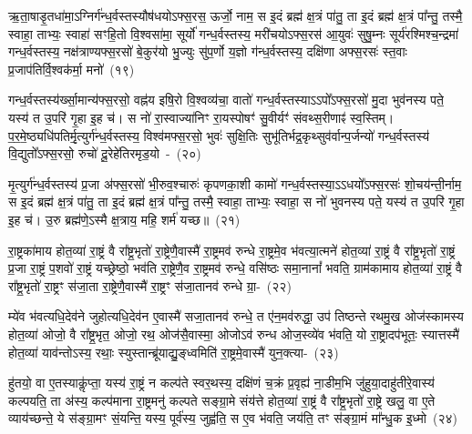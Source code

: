 {\anuvakamend[{प्रा॒जा॒प॒त्याः सो᳚\-ऽष्टाद॑श च}]}

ऋ॒ता॒षाडृ॒तधा॑मा॒\-ऽग्निर्ग॑न्ध॒र्वस्तस्यौष॑धयो\-ऽफ्स॒रस॒ ऊर्जो॒ नाम॒ स इ॒दं ब्रह्म॑ क्ष॒त्रं पा॑तु॒ ता इ॒दं ब्रह्म॑ क्ष॒त्रं पा᳚न्तु॒ तस्मै॒ स्वाहा॒ ताभ्यः॒ स्वाहा॑ सꣳहि॒तो वि॒श्वसा॑मा॒ सूर्यो॑ गन्ध॒र्वस्तस्य॒ मरी॑चयो\-ऽफ्स॒रस॑ आ॒युवः॑ सुषु॒म्नः सूर्य॑रश्मिश्च॒न्द्रमा॑ गन्ध॒र्वस्तस्य॒ नक्ष॑त्राण्यफ्स॒रसो॑ बे॒कुर॑यो भु॒ज्युः सु॑प॒र्णो य॒ज्ञो ग॑न्ध॒र्वस्तस्य॒ दक्षि॑णा अफ्स॒रसः॑ स्त॒वाः प्र॒जा\-प॑तिर्वि॒श्वक॑र्मा॒ मनो॑~(१९)\ip

गन्ध॒र्वस्तस्य॑र्ख्सा॒मान्य॑फ्स॒रसो॒ वह्न॑य इषि॒रो वि॒श्वव्य॑चा॒ वातो॑ गन्ध॒र्वस्तस्या\-ऽऽ\-पो᳚\-ऽफ्स॒रसो॑ मु॒दा भुव॑नस्य पते॒ यस्य॑ त उ॒परि॑ गृ॒हा इ॒ह च॑। स नो॑ रा॒स्वाज्या॑निꣳ रा॒यस्पोषꣳ॑ सु॒वीर्यꣳ॑ संवथ्स॒रीणाꣴ॑ स्व॒स्तिम्। प॒र॒मे॒ष्ठ्यधि॑\-पति\-र्मृ॒त्युर्ग॑न्ध॒र्वस्तस्य॒ विश्व॑मफ्स॒रसो॒ भुवः॑ सुक्षि॒तिः सुभू॑तिर्भद्र॒कृथ्सुव॑र्वान्प॒र्जन्यो॑ गन्ध॒र्वस्तस्य॑ वि॒द्युतो᳚\-ऽफ्स॒रसो॒ रुचो॑ दू॒रेहे॑तिरमृड॒यो~-~(२०)\ip

मृ॒त्युर्ग॑न्ध॒र्वस्तस्य॑ प्र॒जा अ॑फ्स॒रसो॑ भी॒रुव॒श्चारुः॑ कृपणका॒शी कामो॑ गन्ध॒र्वस्तस्या॒\-ऽऽ\-\-धयो᳚\-ऽफ्स॒रसः॑ शो॒चय॑न्ती॒र्नाम॒ स इ॒दं ब्रह्म॑ क्ष॒त्रं पा॑तु॒ ता इ॒दं ब्रह्म॑ क्ष॒त्रं पा᳚न्तु॒ तस्मै॒ स्वाहा॒ ताभ्यः॒ स्वाहा॒ स नो॑ भुवनस्य पते॒ यस्य॑ त उ॒परि॑ गृ॒हा इ॒ह च॑। उ॒रु ब्रह्म॑णे॒\-ऽस्मै क्ष॒त्राय॒ महि॒ शर्म॑ यच्छ॥~(२१)\ip

{\anuvakamend[{मनो॑\-ऽमृड॒यः षट्च॑त्वारिꣳशच्च}]}

रा॒ष्ट्रका॑माय होत॒व्या॑ रा॒ष्ट्रं वै रा᳚ष्ट्र॒भृतो॑ रा॒ष्ट्रेणै॒वास्मै॑ रा॒ष्ट्रमव॑ रुन्धे रा॒ष्ट्रमे॒व भ॑वत्या॒त्मने॑ होत॒व्या॑ रा॒ष्ट्रं वै रा᳚ष्ट्र॒भृतो॑ रा॒ष्ट्रं प्र॒जा रा॒ष्ट्रं प॒शवो॑ रा॒ष्ट्रं यच्छ्रेष्ठो॒ भव॑ति रा॒ष्ट्रेणै॒व रा॒ष्ट्रमव॑ रुन्धे॒ वसि॑ष्ठः समा॒नानां᳚ भवति॒ ग्राम॑कामाय होत॒व्या॑ रा॒ष्ट्रं वै रा᳚ष्ट्र॒भृतो॑ रा॒ष्ट्रꣳ स॑जा॒ता रा॒ष्ट्रेणै॒वास्मै॑ रा॒ष्ट्रꣳ स॑जा॒तानव॑ रुन्धे ग्रा॒-~(२२)\ip

म्ये॑व भ॑वत्यधि॒देव॑ने जुहोत्यधि॒देव॑न ए॒वास्मै॑ सजा॒तानव॑ रुन्धे॒ त ए॑न॒मव॑रुद्धा॒ उप॑ तिष्ठन्ते रथमु॒ख ओज॑स्कामस्य होत॒व्या॑ ओजो॒ वै रा᳚ष्ट्र॒भृत॒ ओजो॒ रथ॒ ओज॑सै॒वास्मा॒ ओजो\-ऽव॑ रुन्ध ओज॒स्व्ये॑व भ॑वति॒ यो रा॒ष्ट्रादप॑भूतः॒ स्यात्तस्मै॑ होत॒व्या॑ याव॑न्तो\-ऽस्य॒ रथाः॒ स्युस्तान्ब्रू॑याद्यु॒ङ्‌ध्वमिति॑ रा॒ष्ट्रमे॒वास्मै॑ युन॒क्त्या-~(२३)\ip

हु॑तयो॒ वा ए॒तस्याकॢ॑प्ता॒ यस्य॑ रा॒ष्ट्रं न कल्प॑ते स्वर॒थस्य॒ दक्षि॑णं च॒क्रं प्र॒वृह्य॑ ना॒डीम॒भि जु॑हुया॒दाहु॑तीरे॒वास्य॑ कल्पयति॒ ता अ॑स्य॒ कल्प॑माना रा॒ष्ट्रमनु॑ कल्पते सङ्ग्रा॒मे संय॑त्ते होत॒व्या॑ रा॒ष्ट्रं वै रा᳚ष्ट्र॒भृतो॑ रा॒ष्ट्रे खलु॒ वा ए॒ते व्याय॑च्छन्ते॒ ये स॑ङ्ग्रा॒मꣳ सं॒यन्ति॒ यस्य॒ पूर्व॑स्य॒ जुह्व॑ति॒ स ए॒व भ॑वति॒ जय॑ति॒ तꣳ स॑ङ्ग्रा॒मं मा᳚न्धु॒क इ॒ध्मो~(२४)\ip

